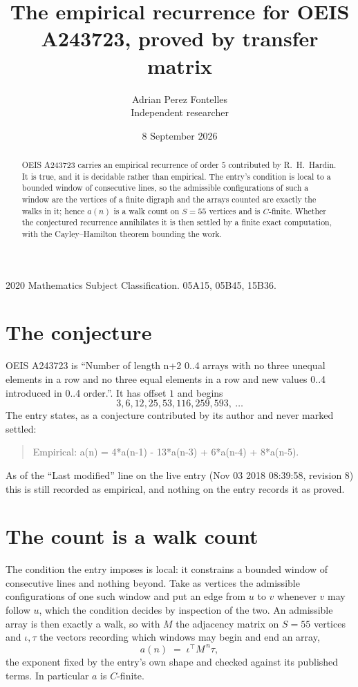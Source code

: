 \documentclass[11pt,a4paper]{article}
\title{The empirical recurrence for OEIS A243723, proved by transfer matrix}
\author{Adrian Perez Fontelles\\ \small Independent researcher}
\date{8 September 2026}
\theoremstyle{plain}
\theoremstyle{definition}
\begin{document}
\maketitle

\begin{abstract}
OEIS A243723 carries an empirical recurrence of order $5$ contributed by R.~H.~Hardin. It is
true, and it is decidable rather than empirical. The entry's condition is local to a bounded window of consecutive lines, so
the admissible configurations of such a window are the vertices of a finite digraph and the
arrays counted are exactly the walks in it; hence $a(n)$ is a walk count on $S=55$ vertices
and is $C$-finite. Whether the conjectured recurrence annihilates it is then settled by a
finite exact computation, with the Cayley--Hamilton theorem bounding the work.
\end{abstract}

\noindent\small 2020 Mathematics Subject Classification. 05A15, 05B45, 15B36.\normalsize

\section{The conjecture}

OEIS A243723 is ``Number of length n+2 0..4 arrays with no three unequal elements in a row and no three equal elements in a row and new values 0..4 introduced in 0..4 order.''. It has offset $1$ and begins
\[
3, 6, 12, 25, 53, 116, 259, 593,\ \dots
\]
The entry states, as a conjecture contributed by its author and never marked settled:
\begin{quote}
Empirical: a(n) = 4*a(n-1) - 13*a(n-3) + 6*a(n-4) + 8*a(n-5).
\end{quote}
As of the ``Last modified'' line on the live entry (Nov 03 2018 08:39:58, revision 8) this is still
recorded as empirical, and nothing on the entry records it as proved.

\section{The count is a walk count}

The condition the entry imposes is local: it constrains a bounded window of consecutive lines and nothing beyond. Take as
vertices the admissible configurations of one such window and put an edge from $u$ to $v$
whenever $v$ may follow $u$, which the condition decides by inspection of the two. An
admissible array is then exactly a walk, so with $M$ the adjacency matrix on $S=55$ vertices
and $\iota,\tau$ the vectors recording which windows may begin and end an array,
\[
a(n)\;=\;\iota^{\!\top}M^{\,n}\tau ,
\]
the exponent fixed by the entry's own shape and checked against its published terms. In
particular $a$ is $C$-finite.
\end{document}

